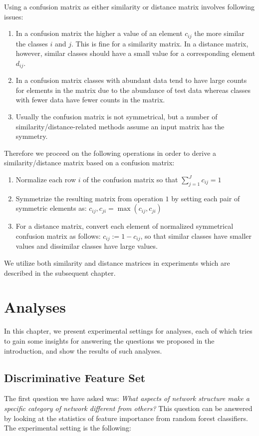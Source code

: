 \documentclass{article}
\begin{document}
Using a confusion matrix as either similarity or distance matrix involves following issues:
\begin{enumerate}
	\item  In a confusion matrix the higher a value of an element $c_{ij}$ the more similar the classes $i$ and $j$. This is fine for a similarity matrix. In a distance matrix, however, similar classes should have a small value for a corresponding element $d_{ij}$.
	\item In a confusion matrix classes with abundant data tend to have large counts for elements in the matrix due to the abundance of test data whereas classes with fewer data have fewer counts in the matrix.
	\item Usually the confusion matrix is not symmetrical, but a number of similarity/distance-related methods assume an input matrix has the symmetry.
\end{enumerate}

Therefore we proceed on the following operations in order to derive a similarity/distance matrix based on a confusion matrix:
\begin{enumerate}
	\item Normalize each row $i$ of the confusion matrix so that $\sum_{j=1}^J c_{ij} = 1$
	\item Symmetrize the resulting matrix from operation $1$ by setting each pair of symmetric elements as: $c_{ij},c_{ji} = \max (c_{ij},c_{ji})$
	\item For a distance matrix, convert each element of normalized symmetrical confusion matrix as follows: $c_{ij} := 1 - c_{ij}$, so that similar classes have smaller values and dissimilar classes have large values.
\end{enumerate}

We utilize both similarity and distance matrices in experiments which are described in the subsequent chapter.
		
\section{Analyses}
In this chapter, we present experimental settings for analyses, each of which tries to gain some insights for answering the questions we proposed in the introduction, and show the results of such analyses.
\subsection{Discriminative Feature Set}
The first question we have asked was: \textit{What aspects of network structure make a specific category of network different from others?} This question can be answered by looking at the statistics of feature importance from random forest classifiers. The experimental setting is the following: 
\end{document}
